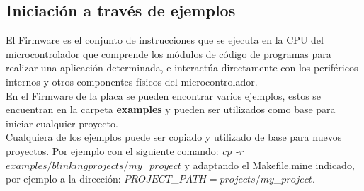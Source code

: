 \documentclass[12pt,letterpaper]{article}
\begin{document}
{\begin{table}[H]
\caption{Utilidades,archivos,y drivers para la placa.}
\label{Tab1}

\end{table}
\begin{table}[H]

\caption{Descripción de archivos generados en un proyecto en RTOS.}
\label{Tab2}

\end{table}
}

\subsection{Iniciación a través de ejemplos}
El Firmware es el conjunto de instrucciones que se ejecuta en la CPU del microcontrolador que comprende los módulos de código de programas para realizar una aplicación determinada, e interactúa directamente con los periféricos internos y otros componentes físicos del microcontrolador.
  \\
  
En el Firmware de la placa se pueden encontrar varios ejemplos, estos se encuentran en la carpeta \textbf{examples} y pueden ser utilizados como base para iniciar cualquier proyecto.
 \\
 
Cualquiera de los ejemplos puede ser copiado y utilizado de base para nuevos proyectos. Por ejemplo con el siguiente comando:	\textit{cp -r $examples/blinking projects/my$\_$proyect$} y adaptando el Makefile.mine indicado, por ejemplo a la dirección: $PROJECT$\_$PATH = projects/my$\_$project$.
\end{document}
